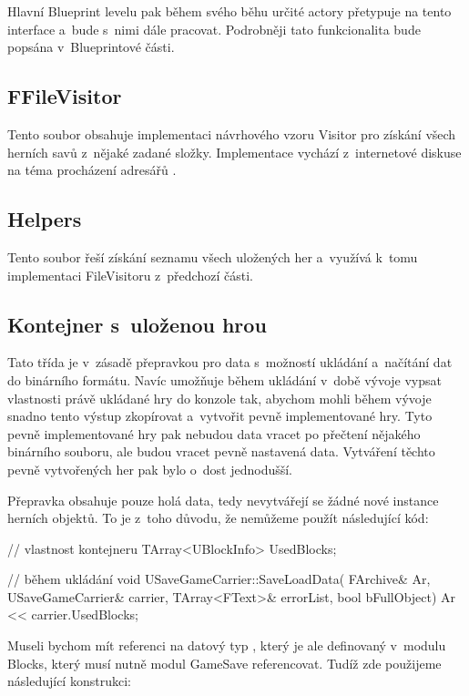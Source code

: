 Hlavní Blueprint levelu pak během svého běhu určité actory přetypuje na tento interface a~bude s~nimi dále pracovat. Podrobněji tato funkcionalita bude popsána v~Blueprintové části.

\subsection{FFileVisitor}


Tento soubor obsahuje implementaci návrhového vzoru Visitor pro získání všech herních savů z~nějaké zadané složky. Implementace vychází z~internetové diskuse na téma procházení adresářů \citep{ue_iterate_dir}.

\subsection{Helpers}

Tento soubor řeší získání seznamu všech uložených her a~využívá k~tomu implementaci FileVisitoru z~předchozí části.

\subsection{Kontejner s~uloženou hrou}
 Tato třída je v~zásadě přepravkou pro data s~možností ukládání a~načítání dat do binárního formátu. Navíc umožňuje během ukládání v~době vývoje vypsat vlastnosti právě ukládané hry do konzole tak, abychom mohli během vývoje snadno tento výstup zkopírovat a~vytvořit pevně implementované hry. Tyto pevně implementované hry pak nebudou data vracet po přečtení nějakého binárního souboru, ale budou vracet pevně nastavená data. Vytváření těchto pevně vytvořených her pak bylo o~dost jednodušší.

Přepravka obsahuje pouze holá data, tedy nevytvářejí se žádné nové instance herních objektů. To je z~toho důvodu, že nemůžeme použít následující kód:

\begin{code}

// vlastnost kontejneru
TArray<UBlockInfo> UsedBlocks;

// během ukládání
void USaveGameCarrier::SaveLoadData(
	FArchive& Ar,
	USaveGameCarrier& carrier,
	TArray<FText>& errorList,
	bool bFullObject)
{
	Ar << carrier.UsedBlocks;
}
\end{code}
Museli bychom mít referenci na datový typ , který je ale definovaný v~modulu Blocks, který musí nutně modul GameSave referencovat. Tudíž zde použijeme následující konstrukci:

